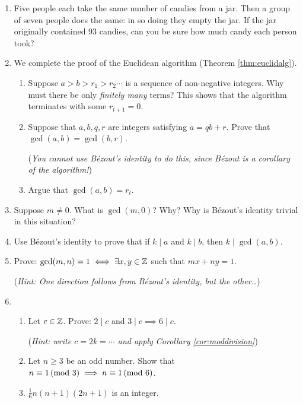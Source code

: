 \begin{exercises}{}{}
\begin{enumerate}
	  \item Five people each take the same number of candies from a jar. Then a group of seven people does the same: in so doing they empty the jar. If the jar originally contained 93 candies, can you be sure how much candy each person took?
	
	
	  \item\label{exs:euclidalgproof} We complete the proof of the Euclidean algorithm (Theorem \ref{thm:euclidalg}).
	  \begin{enumerate}
	    \item Suppose $a>b>r_1>r_2\cdots$ is a sequence of non-negative integers. Why must there be only \emph{finitely many} terms? This shows that the algorithm terminates with some $r_{t+1}=0$.
	    \item Suppose that $a,b,q,r$ are integers satisfying $a=qb+r$. Prove that $\gcd(a,b)=\gcd(b,r)$.\par
	    (\emph{You cannot use Bézout's identity to do this, since Bézout is a corollary of the algorithm!})
	    \item Argue that $\gcd(a,b)=r_t$.
	  \end{enumerate}
	  
	
		\item\label{exs:gcd0} Suppose $m\neq 0$. What is $\gcd(m,0)$? Why? Why is Bézout's identity trivial in this situation?
			
	  
	  \item Use Bézout's identity to prove that if $k\mid a$ and $k\mid b$, then $k\mid\gcd(a,b)$.
	  
	
	  \item\label{ex:gcd1} Prove: $\gcd(m,n)=1\iff\exists x,y\in\mathbb{Z}$ such that $mx+ny=1$.\par
	  (\emph{Hint: One direction follows from Bézout's identity, but the other\ldots})
	    
	    
		\item\begin{enumerate}
		  \item Let $c\in\mathbb{Z}$. Prove: $2\mid c$ and $3\mid c\implies 6\mid c$.\par
		  (\emph{Hint: write $c=2k=\cdots$ and apply Corollary \ref{cor:moddivision}})
		  \item Let $n\ge 3$ be an odd number. Show that $n\equiv 1\negthickspace\pmod{3}\implies  n\equiv 1\negthickspace\pmod{6}$.
		 	\item $\frac 16n(n+1)(2n+1)$ is an integer.
		\end{enumerate}
	  

\end{enumerate}
\end{exercises}
